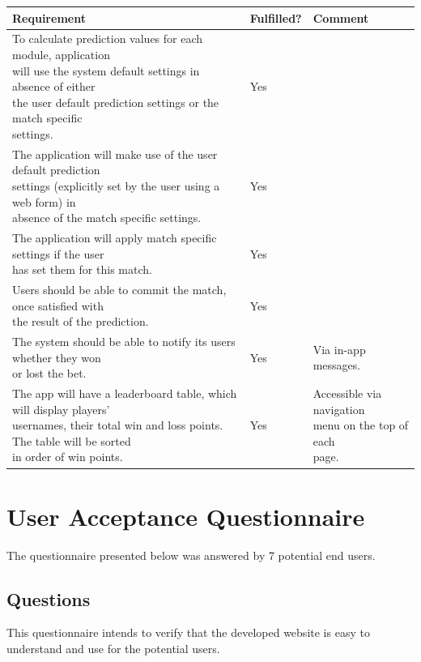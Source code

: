 \begin{tabular}{@{}lll@{}}
	  \hline
        Requirement & Fulfilled? & Comment \\
       \hline 
		\specialcell[t]{To calculate prediction values for each module, application\\ will use the system default settings in absence of either \\ the user default prediction  settings or the match specific \\ settings.} &  Yes &  \\ 
		\specialcell[t]{The application will make use of the user default prediction \\settings (explicitly set by the user using a web form) in \\ absence of the match specific settings.} &  Yes &  \\
		\specialcell[t]{The application will apply match specific settings if the user\\ has set them for this match.} &  Yes &  \\ 
		\specialcell[t]{Users should be able to commit the match, once satisfied with \\ the result of the prediction.} &  Yes &  \\ 		
   		\specialcell[t]{The system should be able to notify its users whether they won \\ or lost the bet.} &  Yes & Via in-app messages. \\
   		\specialcell[t]{The app will have a leaderboard table, which will display players' \\ usernames, their total win and loss points. The table will be sorted\\ in order of win  points.} &  Yes &  \specialcell[t]{Accessible via navigation \\ menu on the top of each \\ page.}\\ 

 \hline
\end{tabular}

\chapter{User Acceptance Questionnaire}
\label{ch:ua_questionnaire_appendix}
The questionnaire presented below was answered by 7 potential end users. 

\section{Questions}
\label{sec:ua_questions_appendix}
This questionnaire intends to verify that the developed website is easy to understand and use for the potential users.

